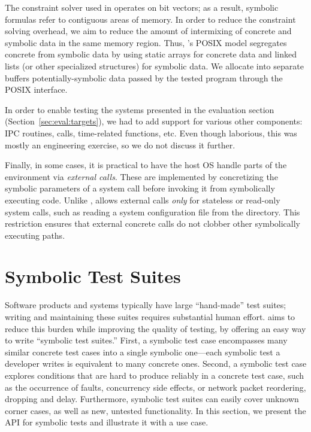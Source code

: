 The constraint solver used in \cnine operates on bit vectors; as a result, symbolic formulas refer to contiguous areas of memory.
%
In order to reduce the constraint solving overhead, we aim to reduce the amount of intermixing of concrete and symbolic data in the same memory region.  Thus, \cnine's POSIX model segregates concrete from symbolic data by using static arrays for concrete data and linked lists (or other specialized structures) for symbolic data.  We allocate into separate buffers potentially-symbolic data passed by the tested program through the POSIX interface.

In order to enable testing the systems presented in the evaluation section (Section~\ref{sec:eval:targets}), we had to add support for various other components: IPC routines,  calls, time-related functions, etc.
%
Even though laborious, this was mostly an engineering exercise, so we do not discuss it further.

Finally, in some cases, it is practical to have the host OS handle parts of the environment via \emph{external calls}.
%
These are implemented by concretizing the symbolic parameters of a system call before invoking it from symbolically executing code. Unlike \cite{dart,klee,exe}, \cnine allows external calls \emph{only} for stateless or read-only system calls, such as reading a system configuration file from the  directory.  This restriction ensures that external concrete calls do not clobber other symbolically executing paths.




\section{Symbolic Test Suites}
\label{sec:cloud9:symtests}

Software products and systems typically have large ``hand-made'' test suites; writing and maintaining these suites requires substantial human effort.
%
\cnine aims to reduce this burden while improving the quality of testing, by offering an easy way to write ``symbolic test suites.''
%
First, a symbolic test case encompasses many similar concrete test cases into a single symbolic one---each symbolic test a developer writes is equivalent to many concrete ones.
%
Second, a symbolic test case explores conditions that are hard to produce reliably in a concrete test case, such as the occurrence of faults, concurrency side effects, or network packet reordering, dropping and delay.
%
Furthermore, symbolic test suites can easily cover unknown corner cases, as well as new, untested functionality.  In this section, we present the API for symbolic tests and illustrate it with a use case.

